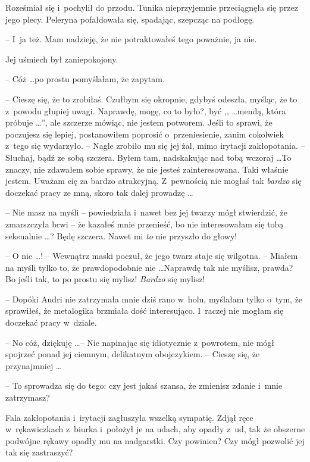 \documentclass[oneside,polish,11pt,rmheadings]{mwbk}
\begin{document}
Roześmiał się i~pochylił do przodu. Tunika nieprzyjemnie przeciągnęła się przez jego plecy. Peleryna pofałdowała się, spadając, szepcząc na podłogę. 

-- I~ja też. Mam nadzieję, że nie potraktowałeś tego poważnie, ja nie. 

Jej uśmiech był zaniepokojony. 

-- Cóż \ldots    po prostu pomyślałam, że zapytam. 

-- Cieszę się, że to zrobiłaś. Czułbym się okropnie, gdybyś odeszła, myśląc, że to z~powodu głupiej uwagi. Naprawdę, mogę, co to było?, być ,, \ldots mendą, która próbuje \ldots '', ale szczerze mówiąc, nie jestem potworem. Jeśli to sprawi, że poczujesz się lepiej, postanowiłem poprosić o~przeniesienie, zanim cokolwiek z~tego się wydarzyło. -- Nagle zrobiło mu się jej żal, mimo irytacji zakłopotania. -- Słuchaj, bądź ze sobą szczera. Byłem tam, nadskakując nad tobą wczoraj \ldots To znaczy, nie zdawałem sobie sprawy, że nie jesteś zainteresowana. Taki właśnie jestem. Uważam cię za bardzo atrakcyjną. Z~pewnością nie mogłaś tak \textit{bardzo }się doczekać pracy ze mną, skoro tak dalej prowadzę \ldots  

-- Nie masz na myśli -- powiedziała i~nawet bez jej twarzy mógł stwierdzić, że zmarszczyła brwi -- że kazałeś mnie przenieść, bo nie interesowałam się tobą seksualnie \ldots ? Będę szczera. Nawet mi \textit{to }nie przyszło do głowy! 

-- O nie  \ldots ! -- Wewnątrz maski poczuł, że jego twarz staje się wilgotna. -- Miałem na myśli tylko to, że prawdopodobnie nie  \ldots  Naprawdę tak nie myślisz, prawda? Bo jeśli tak, to po prostu się mylisz! \textit{Bardzo }się mylisz! 

-- Dopóki Audri nie zatrzymała mnie dziś rano w~holu, myślałam tylko o~tym, że sprawiłeś, że metalogika brzmiała dość interesująco. I~raczej nie mogłam się doczekać pracy w~dziale. 

-- No cóż, dziękuję \ldots  -- Nie napinając się idiotycznie z~powrotem, nie mógł spojrzeć ponad jej ciemnym, delikatnym obojczykiem. -- Cieszę się, że przynajmniej \ldots  

-- To sprowadza się do tego: czy jest jakaś szansa, że zmienisz zdanie i~mnie zatrzymasz? 

Fala zakłopotania i~irytacji zagłuszyła wszelką sympatię. Zdjął ręce w~rękawiczkach z~biurka i~położył je na udach, aby opadły z~ud, tak że obszerne podwójne rękawy opadły mu na nadgarstki. Czy powinien? Czy mógł pozwolić jej tak się zastraszyć? 
\end{document}
